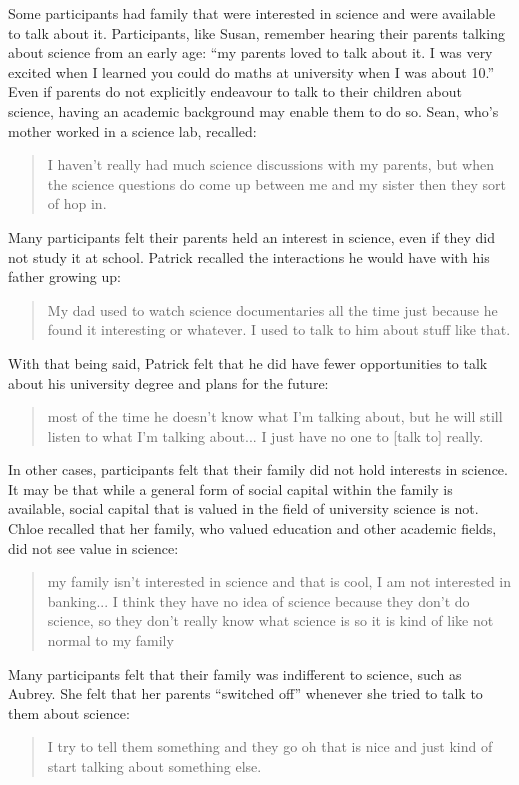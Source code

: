 Some participants had family that were interested in science and were available to  talk about it. Participants, like Susan, remember hearing their parents talking about science from an early age: ``my parents loved to talk about it. I was very excited when I learned you could do maths at university when I was about 10.''  Even if parents do not explicitly endeavour to talk to their children about science, having an academic background may enable them to do so. Sean, who's mother worked in a science lab, recalled: \blockquote{I haven't really had much science discussions with my parents, but when the science questions do come up between me and my sister then they sort of hop in.} Many participants felt their parents held an interest in science, even if they did not study it at school. Patrick recalled the interactions he would have with his father growing up: \blockquote{My dad used to watch science documentaries all the time just because he found it interesting or whatever. I used to talk to him about stuff like that.} With that being said, Patrick felt that he did have fewer opportunities to talk about his university degree and plans for the future: \blockquote{most of the time he doesn't know what I’m talking about, but he will still listen to what I’m talking about...  I just have no one to [talk to] really.}

In other cases, participants felt that their family did not hold interests in science. It may be that while a general form of social capital within the family is available, social capital that is valued in the field of university science is not. Chloe recalled that her family, who valued education and other academic fields, did not see value in science: \blockquote{my family isn't interested in science and that is cool, I am not interested in banking... I think they have no idea of science because they don't do science, so they don't really know what science is so it is kind of like not normal to my family}. Many participants felt that their family was indifferent to science, such as Aubrey. She felt that her parents ``switched off'' whenever she tried to talk to them about science: \blockquote{I try to tell them something and they go oh that is nice and just kind of start talking about something else.} 

